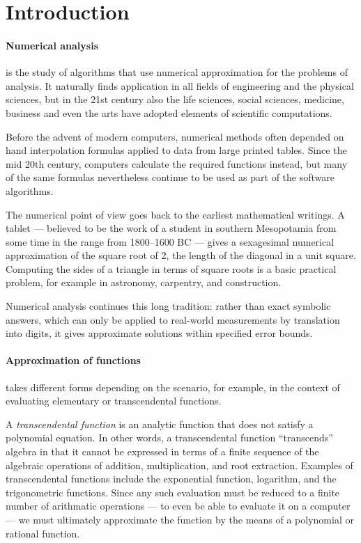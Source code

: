 \section*{Introduction}
\paragraph{Numerical analysis} is the study of algorithms that use numerical approximation for the problems of analysis.
It naturally finds application in all fields of engineering and the physical sciences, but in the 21st century also the life sciences, social sciences, medicine, business and even the arts have adopted elements of scientific computations.

Before the advent of modern computers, numerical methods often depended on hand interpolation formulas applied to data from large printed tables.
Since the mid 20th century, computers calculate the required functions instead, but many of the same formulas nevertheless continue to be used as part of the software algorithms.

The numerical point of view goes back to the earliest mathematical writings.
A tablet --- believed to be the work of a student in southern Mesopotamia from some time in the range from 1800–1600 BC --- gives a sexagesimal numerical approximation of the square root of 2, the length of the diagonal in a unit square.
Computing the sides of a triangle in terms of square roots is a basic practical problem, for example in astronomy, carpentry, and construction.

Numerical analysis continues this long tradition: rather than exact symbolic answers, which can only be applied to real-world measurements by translation into digits, it gives approximate solutions within specified error bounds.

\paragraph{Approximation of functions} takes different forms depending on the scenario, for example, in the context of evaluating elementary or transcendental functions.

A \emph{transcendental function} is an analytic function that does not satisfy a polynomial equation.
In other words, a transcendental function ``transcends'' algebra in that it cannot be expressed in terms of a finite sequence of the algebraic operations of addition, multiplication, and root extraction.
Examples of transcendental functions include the exponential function, logarithm, and the trigonometric functions.
Since any such evaluation must be reduced to a finite number of arithmatic operations --- to even be able to evaluate it on a computer --- we must ultimately approximate the function by the means of a polynomial or rational function.

